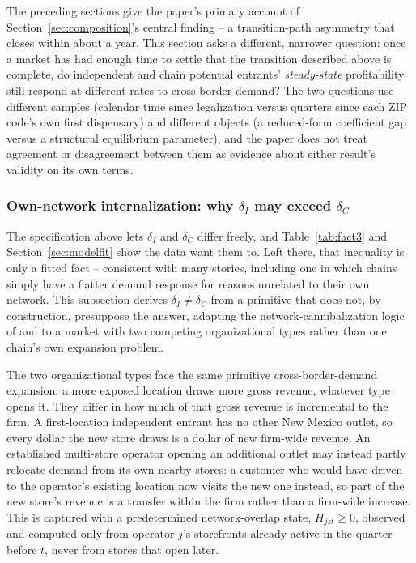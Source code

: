 \documentclass[english,12pt]{article}
\begin{document}
The preceding sections give the paper's primary account of Section~\ref{sec:composition}'s central finding -- a transition-path asymmetry that closes within about a year. This section asks a different, narrower question: once a market has had enough time to settle that the transition described above is complete, do independent and chain potential entrants' \emph{steady-state} profitability still respond at different rates to cross-border demand? The two questions use different samples (calendar time since legalization versus quarters since each ZIP code's own first dispensary) and different objects (a reduced-form coefficient gap versus a structural equilibrium parameter), and the paper does not treat agreement or disagreement between them as evidence about either result's validity on its own terms.

\subsubsection{Own-network internalization: why $\delta_I$ may exceed $\delta_C$}
\label{sec:cannibalization}

The specification above lets $\delta_I$ and $\delta_C$ differ freely, and Table~\ref{tab:fact3} and Section~\ref{sec:modelfit} show the data want them to. Left there, that inequality is only a fitted fact -- consistent with many stories, including one in which chains simply have a flatter demand response for reasons unrelated to their own network. This subsection derives $\delta_I \neq \delta_C$ from a primitive that does not, by construction, presuppose the answer, adapting the network-cannibalization logic of \citet{Nishida2008} and \citet{Holmes2011} to a market with two competing organizational types rather than one chain's own expansion problem.

The two organizational types face the same primitive cross-border-demand expansion: a more exposed location draws more gross revenue, whatever type opens it. They differ in how much of that gross revenue is incremental to the firm. A first-location independent entrant has no other New Mexico outlet, so every dollar the new store draws is a dollar of new firm-wide revenue. An established multi-store operator opening an additional outlet may instead partly relocate demand from its own nearby stores: a customer who would have driven to the operator's existing location now visits the new one instead, so part of the new store's revenue is a transfer within the firm rather than a firm-wide increase. This is captured with a predetermined network-overlap state, $H_{jzt}\ge 0$, observed and computed only from operator $j$'s storefronts already active in the quarter before $t$, never from stores that open later.
\end{document}
